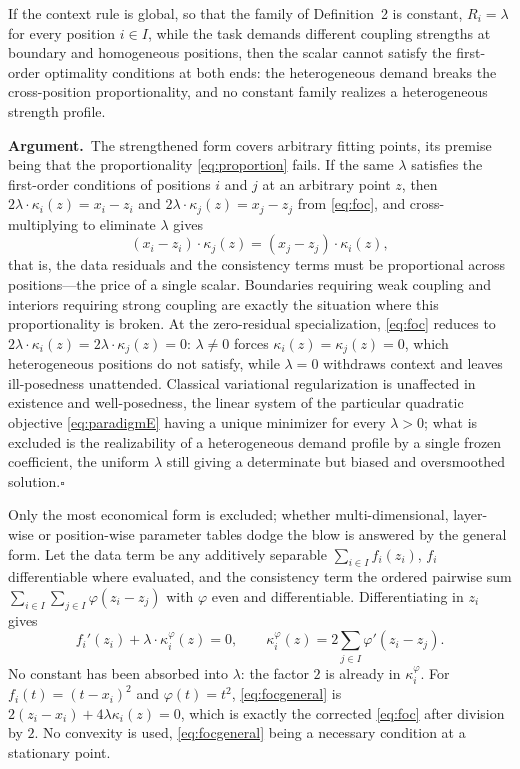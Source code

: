 \documentclass[twoside,11pt]{article}
\newcommand{\argument}{\par\medskip\noindent\textbf{Argument.}\ }
\newcommand{\qedbox}{\hfill$\square$}
\begin{document}
\begin{lemma}
If the context rule is global, so that the family of Definition~2 is constant, $R_i = \lambda$ for every position $i \in I$, while the task demands different coupling strengths at boundary and homogeneous positions, then the scalar cannot satisfy the first-order optimality conditions at both ends: the heterogeneous demand breaks the cross-position proportionality, and no constant family realizes a heterogeneous strength profile.
\end{lemma}

\argument The strengthened form covers arbitrary fitting points, its premise being that the proportionality \eqref{eq:proportion} fails. If the same $\lambda$ satisfies the first-order conditions of positions $i$ and $j$ at an arbitrary point $z$, then $2\lambda \cdot \kappa_i (z) = x_i - z_i$ and $2\lambda \cdot \kappa_j (z) = x_j - z_j$ from \eqref{eq:foc}, and cross-multiplying to eliminate $\lambda$ gives
\begin{equation}
(x_i - z_i) \cdot \kappa_j (z) = (x_j - z_j) \cdot \kappa_i (z),
\label{eq:proportion}
\end{equation}
that is, the data residuals and the consistency terms must be proportional across positions---the price of a single scalar. Boundaries requiring weak coupling and interiors requiring strong coupling are exactly the situation where this proportionality is broken. At the zero-residual specialization, \eqref{eq:foc} reduces to $2\lambda \cdot \kappa_i (z) = 2\lambda \cdot \kappa_j (z) = 0$: $\lambda \neq 0$ forces $\kappa_i (z) = \kappa_j (z) = 0$, which heterogeneous positions do not satisfy, while $\lambda = 0$ withdraws context and leaves ill-posedness unattended. Classical variational regularization is unaffected in existence and well-posedness, the linear system of the particular quadratic objective \eqref{eq:paradigmE} having a unique minimizer for every $\lambda > 0$; what is excluded is the realizability of a heterogeneous demand profile by a single frozen coefficient, the uniform $\lambda$ still giving a determinate but biased and oversmoothed solution.\qedbox

Only the most economical form is excluded; whether multi-dimensional, layer-wise or position-wise parameter tables dodge the blow is answered by the general form. Let the data term be any additively separable $\sum_{i \in I} f_i(z_i)$, $f_i$ differentiable where evaluated, and the consistency term the ordered pairwise sum $\sum_{i \in I} \sum_{j \in I} \varphi(z_i - z_j)$ with $\varphi$ even and differentiable. Differentiating in $z_i$ gives
\begin{equation}
f_i'(z_i) + \lambda \cdot \kappa_i^{\varphi}(z) = 0, \qquad \kappa_i^{\varphi}(z) = 2 \sum_{j \in I} \varphi'(z_i - z_j).
\label{eq:focgeneral}
\end{equation}
No constant has been absorbed into $\lambda$: the factor $2$ is already in $\kappa_i^{\varphi}$. For $f_i(t) = (t - x_i)^2$ and $\varphi(t) = t^2$, \eqref{eq:focgeneral} is $2(z_i-x_i)+4\lambda\kappa_i(z)=0$, which is exactly the corrected \eqref{eq:foc} after division by $2$. No convexity is used, \eqref{eq:focgeneral} being a necessary condition at a stationary point.
\end{document}
